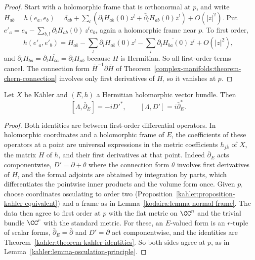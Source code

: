 \begin{proof}
Start with a holomorphic frame that is orthonormal at $p$, and write $H_{ab} = h(e_a, e_b) = \delta_{ab} + \sum_l(\partial_lH_{ab}(0)z^l + \bar\partial_lH_{ab}(0)\bar z^l) + O(|z|^2)$.
Put $e'_a = e_a - \sum_{b,l}\partial_lH_{ab}(0)\,z^le_b$, again a holomorphic frame near $p$. To first order,
\[
h(e'_a, e'_b) = H_{ab} - \sum_l\partial_lH_{ab}(0)z^l - \sum_l\overline{\partial_lH_{ba}(0)}\,\bar z^l + O(|z|^2),
\]
and $\overline{\partial_lH_{ba}} = \bar\partial_l\overline{H_{ba}} = \bar\partial_lH_{ab}$ because $H$ is Hermitian. So all first-order terms cancel. The connection
form $\overline{H}^{-1}\partial\overline{H}$ of Theorem~\ref{complex-manifolds:theorem-chern-connection} involves only first derivatives of $H$,
so it vanishes at $p$.
\end{proof}

\begin{theorem}\label{kodaira:theorem-kahler-identities-bundle}
Let $X$ be K\"ahler and $(E, h)$ a Hermitian holomorphic vector bundle. Then
\[
[\Lambda, \bar\partial_E] = -iD'^*, \qquad [\Lambda, D'] = i\bar\partial_E^* .
\]
\end{theorem}

\begin{proof}
Both identities are between first-order differential operators. In holomorphic coordinates and a holomorphic frame of $E$, the coefficients
of these operators at a point are universal expressions in the metric coefficients $h_{j\bar k}$ of $X$, the matrix $H$ of $h$, and their
first derivatives at that point. Indeed $\bar\partial_E$ acts componentwise, $D' = \partial + \theta$ where the connection form $\theta$ involves
first derivatives of $H$, and the formal adjoints are obtained by integration by parts, which differentiates the pointwise inner products and
the volume form once. Given $p$, choose coordinates osculating to order two (Proposition~\ref{kahler:proposition-kahler-equivalent}) and a frame
as in Lemma~\ref{kodaira:lemma-normal-frame}. The data then agree to first order at $p$ with the flat metric on $\CC^n$ and the trivial bundle
$\CC^r$ with the standard metric. For these, an $E$-valued form is an $r$-tuple of scalar forms, $\bar\partial_E = \bar\partial$ and $D' = \partial$
act componentwise, and the identities are Theorem~\ref{kahler:theorem-kahler-identities}. So both sides agree at $p$, as in
Lemma~\ref{kahler:lemma-osculation-principle}.
\end{proof}

